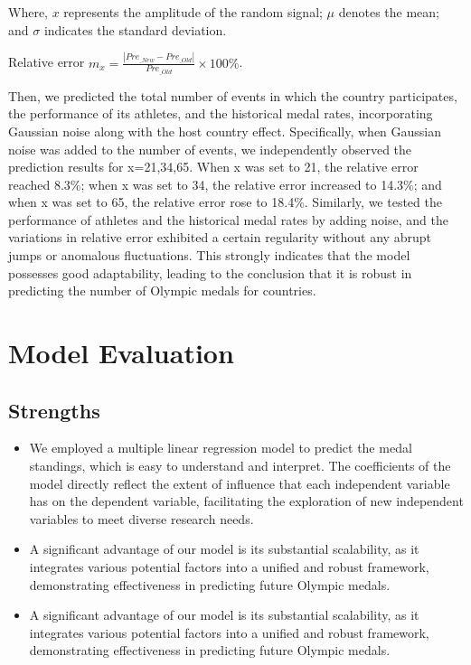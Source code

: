 \documentclass{mcmthesis}
\begin{document}
Where, $x$ represents the amplitude of the random signal; $\mu$ denotes the mean; and $\sigma$ indicates the standard deviation.

Relative error $m_{x} = \frac{\left | Pre_{\_New} - Pre_{\_Old}\right |}{Pre_{\_Old}}\times 100\%$.

Then, we predicted the total number of events in which the country participates, the performance of its athletes, and the historical medal rates, incorporating Gaussian noise along with the host country effect. Specifically, when Gaussian noise was added to the number of events, we independently observed the prediction results for x=21,34,65. When x was set to 21, the relative error reached 8.3\%; when x was set to 34, the relative error increased to 14.3\%; and when x was set to 65, the relative error rose to 18.4\%. Similarly, we tested the performance of athletes and the historical medal rates by adding noise, and the variations in relative error exhibited a certain regularity without any abrupt jumps or anomalous fluctuations. This strongly indicates that the model possesses good adaptability, leading to the conclusion that it is robust in predicting the number of Olympic medals for countries.

\section{Model Evaluation}
\subsection{Strengths}
\begin{itemize}
\item We employed a multiple linear regression model to predict the medal standings, which is easy to understand and interpret. The coefficients of the model directly reflect the extent of influence that each independent variable has on the dependent variable, facilitating the exploration of new independent variables to meet diverse research needs.

\item A significant advantage of our model is its substantial scalability, as it integrates various potential factors into a unified and robust framework, demonstrating effectiveness in predicting future Olympic medals.

\item A significant advantage of our model is its substantial scalability, as it integrates various potential factors into a unified and robust framework, demonstrating effectiveness in predicting future Olympic medals.
\end{itemize}
\end{document}
